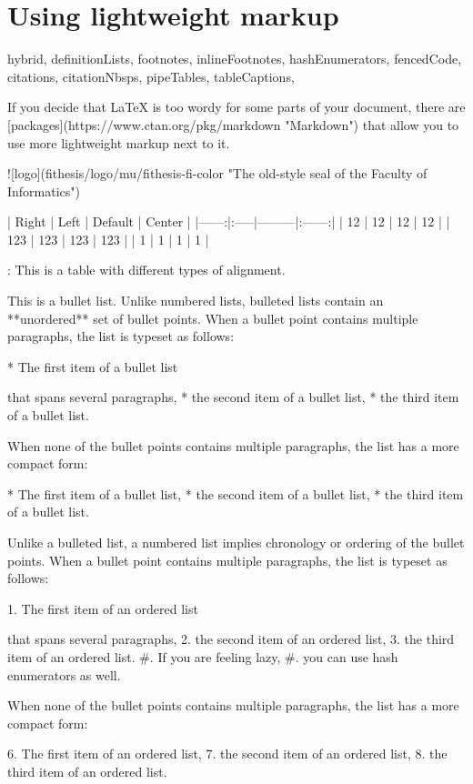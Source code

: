 \documentclass[
  digital,     %
  oneside,     %
  nosansbold,  %
  nocolorbold, %
  lof,         %
  lot,         %
]{fithesis4}
\begin{document}
\chapter{Using lightweight markup}
\shorthandoff{-}
\begin{markdown*}{%
  hybrid,
  definitionLists,
  footnotes,
  inlineFootnotes,
  hashEnumerators,
  fencedCode,
  citations,
  citationNbsps,
  pipeTables,
  tableCaptions,
}

If you decide that \LaTeX{} is too wordy for some parts of your
document, there are [packages](https://www.ctan.org/pkg/markdown
"Markdown") that allow you to use more lightweight markup next
to it.

 ![logo](fithesis/logo/mu/fithesis-fi-color "The old-style seal of
         the Faculty of Informatics")

| Right | Left | Default | Center |
|------:|:-----|---------|:------:|
|    12 | 12   | 12      |   12   |
|   123 | 123  | 123     |   123  |
|     1 | 1    | 1       |    1   |

: This is a table with different types of alignment.

This is a bullet list. Unlike numbered lists, bulleted lists
contain an **unordered** set of bullet points. When a bullet point
contains multiple paragraphs, the list is typeset as follows:

  * The first item of a bullet list

    that spans several paragraphs,
  * the second item of a bullet list,
  * the third item of a bullet list.

When none of the bullet points contains multiple paragraphs, the
list has a more compact form:

  * The first item of a bullet list,
  * the second item of a bullet list,
  * the third item of a bullet list.

Unlike a bulleted list, a numbered list implies chronology or
ordering of the bullet points. When a bullet point
contains multiple paragraphs, the list is typeset as follows:

  1. The first item of an ordered list

     that spans several paragraphs,
  2. the second item of an ordered list,
  3. the third item of an ordered list.
  #. If you are feeling lazy,
  #. you can use hash enumerators as well.

When none of the bullet points contains multiple paragraphs, the
list has a more compact form:

  6. The first item of an ordered list,
  7. the second item of an ordered list,
  8. the third item of an ordered list.


\end{markdown*}
\end{document}
